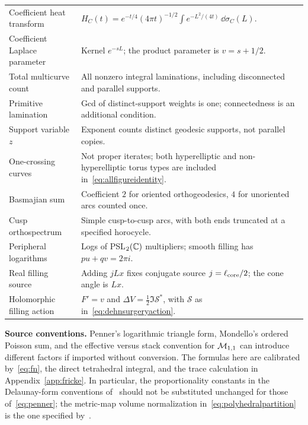 \begin{longtable}{@{}>{\raggedright\arraybackslash}p{}
 >{\raggedright\arraybackslash}p{}@{}}
Coefficient heat transform & $H_C(t)=e^{-t/4}(4\pi t)^{-1/2}\int e^{-L^2/(4t)}\,\dd\sigma_C(L)$.\\
Coefficient Laplace parameter & Kernel $e^{-sL}$; the product parameter is $v=s+1/2$.\\
Total multicurve count & All nonzero integral laminations, including disconnected and parallel supports.\\
Primitive lamination & Gcd of distinct-support weights is one; connectedness is an additional condition.\\
Support variable $z$ & Exponent counts distinct geodesic supports, not parallel copies.\\
One-crossing curves & Not proper iterates; both hyperelliptic and non-hyperelliptic torus types are included in~\eqref{eq:allfigureidentity}.\\
Basmajian sum & Coefficient $2$ for oriented orthogeodesics, $4$ for unoriented arcs counted once.\\
Cusp orthospectrum & Simple cusp-to-cusp arcs, with both ends truncated at a specified horocycle.\\
Peripheral logarithms & Logs of PSL$_2(\mathbb C)$ multipliers; smooth filling has $pu+qv=2\pi i$.\\
Real filling source & Adding $jLx$ fixes conjugate source $j=\ell_{\rm core}/2$; the cone angle is $Lx$.\\
Holomorphic filling action & $F'=v$ and $\Delta V=\frac12\Im\mathcal S^*$, with $\mathcal S$ as in~\eqref{eq:dehnsurgeryaction}.\\
\bottomrule
\end{longtable}
\endgroup

\noindent\textbf{Source conventions.}
Penner's logarithmic triangle form, Mondello's ordered Poisson sum, and
the effective versus stack convention for $\mathcal M_{1,1}$ can introduce different
factors if imported without conversion. The formulas here are calibrated
by~\eqref{eq:fn}, the direct tetrahedral integral, and the trace calculation
in Appendix~\ref{app:fricke}. In particular, the proportionality constants
in the Delaunay-form conventions of~\cite{CDE} should not be substituted
unchanged for those of~\eqref{eq:penner}; the metric-map volume normalization
in~\eqref{eq:polyhedralpartition} is the one specified by~\cite{Budd}.


